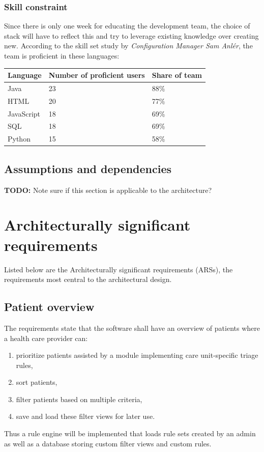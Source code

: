 \documentclass{article}
\begin{document}
\subsubsection{Skill constraint}
Since there is only one week for educating the development team, the choice of stack will have to reflect this and try to leverage existing knowledge over creating new. According to the skill set study by \emph{Configuration Manager Sam Anlér}, the team is proficient in these languages:

\begin{table}[h]
\centering
\begin{tabular}{|l|l|l|}
\hline
Language & Number of proficient users & Share of team \\ \hline
Java & 23 & 88\% \\
HTML & 20 & 77\% \\ 
JavaScript & 18 & 69\% \\ 
SQL & 18 & 69\% \\ 
Python & 15 & 58\% \\ 
\hline
\end{tabular}
\end{table}



\subsection{Assumptions and dependencies}
\textbf{TODO:}
Note sure if this section is applicable to the architecture?


\section{Architecturally significant requirements}
Listed below are the Architecturally significant requirements (ARSs), the requirements most central to the architectural design. 

\subsection{Patient overview}
The requirements state that the software shall have an overview of patients where a health care provider can:
\begin{enumerate}[label=(\roman*)]
\item prioritize patients assisted by a module implementing care unit-specific triage rules,
\item sort patients,
\item filter patients based on multiple criteria,
\item save and load these filter views for later use.
\end{enumerate}
Thus a rule engine will be implemented that loads rule sets created by an admin as well as a database storing custom filter views and custom rules.
\end{document}
